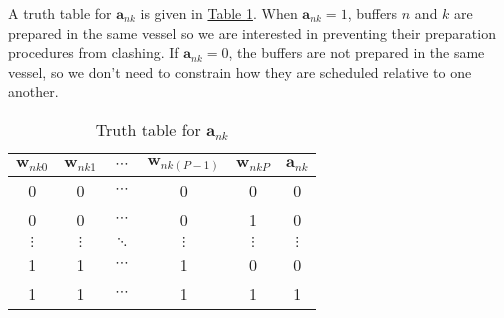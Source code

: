 A truth table for $\boldsymbol{a}_{nk}$ is given in
\hyperref[tbl.trutha]{Table \ref*{tbl.trutha}}.
When $\boldsymbol{a}_{nk} = 1$, buffers $n$ and $k$ are prepared in the same
vessel so we are interested in preventing their preparation procedures from
clashing. If $\boldsymbol{a}_{nk} = 0$, the buffers are not prepared in the 
same vessel, so we don't need to constrain how they are scheduled relative to
one another.
\begin{table}[h!]
    \centering
    \caption{Truth table for $\boldsymbol{a}_{nk}$}
    \label{tbl.trutha}
    \begin{tabular}{c c c c c | c}
        $\boldsymbol{w}_{nk0}$ & $\boldsymbol{w}_{nk1}$ & $\cdots$
        & $\boldsymbol{w}_{nk\left(P-1\right)}$ & $\boldsymbol{w}_{nkP}$
        & $\boldsymbol{a}_{nk}$ \\ \hline
        0 & 0 & $\cdots$ & 0 & 0 & 0\\
        0 & 0 & $\cdots$ & 0 & 1 & 0\\
        $\vdots$ & $\vdots$ & $\ddots$ & $\vdots$& $\vdots$ & $\vdots$\\
        1 & 1 & $\cdots$ & 1 & 0 & 0\\
        1 & 1 & $\cdots$ & 1 & 1 & 1\\
    \end{tabular}
\end{table}

